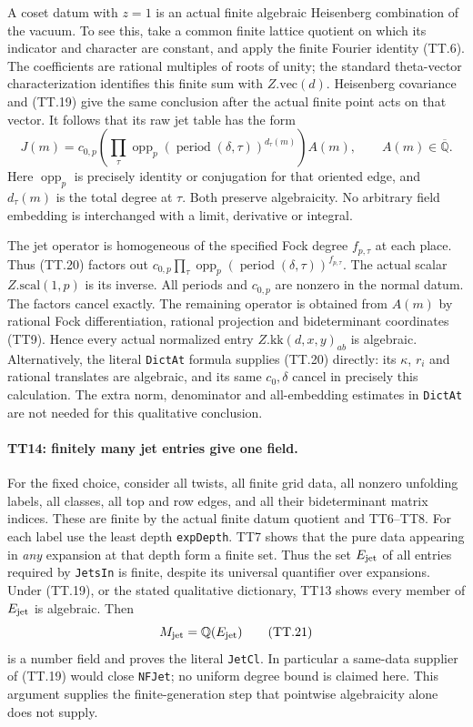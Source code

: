 A coset datum with $z=1$ is an actual finite algebraic Heisenberg
combination of the vacuum. To see this, take a common finite
lattice quotient on which its indicator and character are
constant, and apply the finite Fourier identity (TT.6). The
coefficients are rational multiples of roots of unity; the
standard theta-vector characterization identifies this finite sum
with $Z.\mathrm{vec}(d)$. Heisenberg covariance and (TT.19) give
the same conclusion after the actual finite point acts on that
vector. It follows that its raw jet table has the form
\[
 J(m)=c_{0,p}\left(\prod_\tau
        \operatorname{opp}_p(\operatorname{period}(\delta,\tau))
                      ^{d_\tau(m)}\right)A(m),
                   \qquad A(m)\in\overline{\mathbb Q}.     \tag{TT.20}
\]
Here $\operatorname{opp}_p$ is precisely identity or conjugation
for that oriented edge, and $d_\tau(m)$ is the total degree at
$\tau$. Both preserve algebraicity. No arbitrary field embedding
is interchanged with a limit, derivative or integral.

The jet operator is homogeneous of the specified Fock degree
$f_{p,\tau}$ at each place. Thus (TT.20) factors out
$c_{0,p}\prod_\tau\operatorname{opp}_p
(\operatorname{period}(\delta,\tau))^{f_{p,\tau}}$.
The actual scalar $Z.\mathrm{scal}(1,p)$ is its inverse.
All periods and $c_{0,p}$ are nonzero in the normal datum. The
factors cancel exactly. The remaining operator is obtained from
$A(m)$ by rational Fock differentiation, rational projection and
bideterminant coordinates (TT9). Hence every actual normalized
entry $Z.\mathrm{kk}(d,x,y)_{ab}$ is algebraic. Alternatively,
the literal \texttt{DictAt} formula supplies (TT.20) directly:
its $\kappa$, $r_i$ and rational translates are algebraic, and
its same $c_0,\delta$ cancel in precisely this calculation. The
extra norm, denominator and all-embedding estimates in
\texttt{DictAt} are not needed for this qualitative conclusion.

\paragraph{TT14: finitely many jet entries give one field.}
For the fixed choice, consider all twists, all finite grid data,
all nonzero unfolding labels, all classes, all top and row edges,
and all their bideterminant matrix indices. These are finite by
the actual finite datum quotient and TT6--TT8. For each label use
the least depth \texttt{expDepth}. TT7 shows that the pure data
appearing in \emph{any} expansion at that depth form a finite
set. Thus the set $E_{\rm jet}$ of all entries required by
\texttt{JetsIn} is finite, despite its universal quantifier over
expansions. Under (TT.19), or the stated qualitative dictionary,
TT13 shows every member of $E_{\rm jet}$ is algebraic. Then
\[
                  M_{\rm jet}=\mathbb Q(E_{\rm jet})        \tag{TT.21}
\]
is a number field and proves the literal \texttt{JetCl}. In
particular a same-data supplier of (TT.19) would close
\texttt{NFJet}; no uniform degree bound is claimed here. This
argument supplies the finite-generation step that pointwise
algebraicity alone does not supply.

